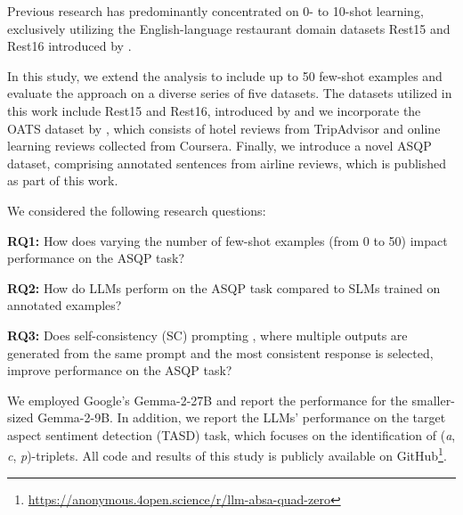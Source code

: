 Previous research has predominantly concentrated on 0- to 10-shot learning, exclusively utilizing the English-language restaurant domain datasets Rest15 and Rest16 introduced by \citet{zhang2021aspect}. 

In this study, we extend the analysis to include up to 50 few-shot examples and evaluate the approach on a diverse series of five datasets. The datasets utilized in this work include Rest15 and Rest16, introduced by \citet{zhang2021towards} and we incorporate the OATS dataset by \citet{chebolu2024oats}, which consists of hotel reviews from TripAdvisor and online learning reviews collected from Coursera. Finally, we introduce a novel ASQP dataset, comprising annotated sentences from airline reviews, which is published as part of this work.

We considered the following research questions:

\begin{description}
  \item \textbf{RQ1:} How does varying the number of few-shot examples (from 0 to 50) impact performance on the ASQP task?
  \item \textbf{RQ2:} How do LLMs perform on the ASQP task compared to SLMs trained on annotated examples? 
  \item \textbf{RQ3:} Does self-consistency (SC) prompting \citep{wang2022self}, where multiple outputs are generated from the same prompt and the most consistent response is selected, improve performance on the ASQP task?
\end{description}

We employed Google's Gemma-2-27B \citep{team2024gemma} and report the performance for the smaller-sized Gemma-2-9B. In addition, we report the LLMs' performance on the target aspect sentiment detection (TASD) task, which focuses on the identification of (\textit{a}, \textit{c}, \textit{p})-triplets. All code and results of this study is publicly available on GitHub\footnote{\url{https://anonymous.4open.science/r/llm-absa-quad-zero}}.

